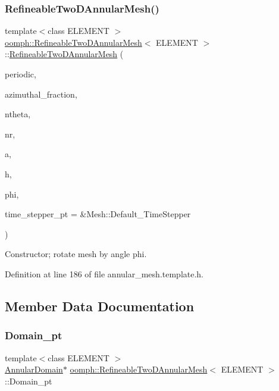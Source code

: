 \subsubsection{\texorpdfstring{Refineable\+Two\+D\+Annular\+Mesh()}{RefineableTwoDAnnularMesh()}\hspace{0.1cm}{\footnotesize\ttfamily [2/2]}}
{\footnotesize\ttfamily template$<$class E\+L\+E\+M\+E\+NT $>$ \\
\hyperlink{classoomph_1_1RefineableTwoDAnnularMesh}{oomph\+::\+Refineable\+Two\+D\+Annular\+Mesh}$<$ E\+L\+E\+M\+E\+NT $>$\+::\hyperlink{classoomph_1_1RefineableTwoDAnnularMesh}{Refineable\+Two\+D\+Annular\+Mesh} (\begin{DoxyParamCaption}\item[{const bool \&}]{periodic,  }\item[{const double \&}]{azimuthal\+\_\+fraction,  }\item[{const unsigned \&}]{ntheta,  }\item[{const unsigned \&}]{nr,  }\item[{const double \&}]{a,  }\item[{const double \&}]{h,  }\item[{const double \&}]{phi,  }\item[{Time\+Stepper $\ast$}]{time\+\_\+stepper\+\_\+pt = {\ttfamily \&Mesh\+:\+:Default\+\_\+TimeStepper} }\end{DoxyParamCaption})\hspace{0.3cm}{\ttfamily [inline]}}



Constructor; rotate mesh by angle phi. 



Definition at line 186 of file annular\+\_\+mesh.\+template.\+h.



\subsection{Member Data Documentation}
\mbox{\label{classoomph_1_1RefineableTwoDAnnularMesh_abcf8125abca9f4e5659f03ceffcb9584}} 
\subsubsection{\texorpdfstring{Domain\+\_\+pt}{Domain\_pt}}
{\footnotesize\ttfamily template$<$class E\+L\+E\+M\+E\+NT $>$ \\
\hyperlink{classoomph_1_1AnnularDomain}{Annular\+Domain}$\ast$ \hyperlink{classoomph_1_1RefineableTwoDAnnularMesh}{oomph\+::\+Refineable\+Two\+D\+Annular\+Mesh}$<$ E\+L\+E\+M\+E\+NT $>$\+::Domain\+\_\+pt\hspace{0.3cm}{\ttfamily [private]}}



